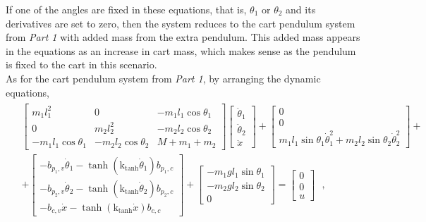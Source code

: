 If one of the angles are fixed in these equations, that is, $\theta_1$ or $\theta_2$ and its derivatives are set to zero, then the system reduces to the cart pendulum system from \textit{Part 1} with added mass from the extra pendulum. This added mass appears in the equations as an increase in cart mass, which makes sense as the pendulum is fixed to the cart in this scenario.\\
As for the cart pendulum system from \textit{Part 1}, by arranging the dynamic equations,
%
\begingroup\makeatletter\def\f@size{10}\check@mathfonts
\def\maketag@@@#1{\hbox{\m@th\normalsize\normalfont#1}}%
\begin{align}
  \begin{split}
    &
    \begin{bmatrix}
      m_1 l_1^2              & 0                       &  -m_1 l_1 \cos \theta_1 \\
      0                      & m_2 l_2^2               &  -m_2 l_2 \cos \theta_2\\
      -m_1 l_1 \cos \theta_1 & -m_2 l_2 \cos \theta_2  &  M + m_1 + m_2
    \end{bmatrix}
    \begin{bmatrix}
      \ddot{\theta}_1  \\
      \ddot{\theta}_2  \\
      \ddot{x}
    \end{bmatrix}
    +
    \begin{bmatrix}
    0  \\
    0  \\
    m_1 l_1 \sin \theta_1 \dot{\theta}_1^2 + m_2 l_2 \sin \theta_2 \dot{\theta}_2^2
    \end{bmatrix}
    +   \\
    &+
    \begin{bmatrix}
      -b_{p_1,v} \dot{\theta}_1 - \tanh(\text{k}_\text{tanh}\dot{\theta}_1) b_{p_1,c}    \\
      -b_{p_2,v} \dot{\theta}_2 - \tanh(\text{k}_\text{tanh}\dot{\theta}_2) b_{p_2,c}    \\
      -b_{c,v} \dot{x} - \tanh(\text{k}_\text{tanh}\dot{x}) b_{c,c}
    \end{bmatrix}
    +
    \begin{bmatrix}
      -m_1 g l_1 \sin \theta_1  \\
      -m_2 g l_2 \sin \theta_2  \\
      0
    \end{bmatrix}
    =
    \begin{bmatrix}
      0  \\
      0  \\
      u
    \end{bmatrix} \ \ \ , 
  \end{split}
  \label{eq:theta1Theta2Xdynamics} \\ \nonumber
\end{align}
\endgroup \vspace{-44pt}

